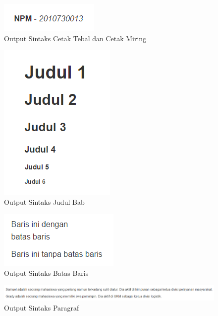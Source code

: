 \begin{figure}[H]
\centering
\includegraphics[scale=1]{Gambar/cetaktebal.png}
\caption[Output Sintaks Cetak Tebal dan Cetak Miring]{Output Sintaks Cetak Tebal
dan Cetak Miring}
\label{fig:cetaktebal}
\end{figure}

\begin{figure}[H]
\centering
\includegraphics[scale=1]{Gambar/judul.png}
\caption[Output Sintaks Judul Bab]{Output Sintaks Judul Bab} 
\label{fig:judul}
\end{figure}

\begin{figure}[H]
\centering
\includegraphics[scale=1]{Gambar/batasbaris.png}
\caption[Output Sintaks Batas Baris]{Output Sintaks Batas Baris} 
\label{fig:batasbaris}
\end{figure}

\begin{figure}[H]
\centering
\includegraphics[scale=0.5]{Gambar/paragraf.png}
\caption[Output Sintaks Paragraf]{Output Sintaks Paragraf} 
\label{fig:paragraf}
\end{figure}


